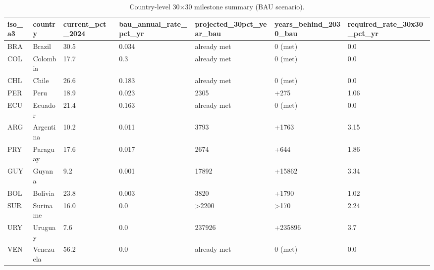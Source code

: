 \begin{table}[htbp]
\centering
\small
\begin{tabular}{lllllll}
\hline
iso\_a3 & country & current\_pct\_2024 & bau\_annual\_rate\_pct\_yr & projected\_30pct\_year\_bau & years\_behind\_2030\_bau & required\_rate\_30x30\_pct\_yr \\
\hline
BRA & Brazil & 30.5 & 0.034 & already met & 0 (met) & 0.0 \\
COL & Colombia & 17.7 & 0.3 & already met & 0 (met) & 0.0 \\
CHL & Chile & 26.6 & 0.183 & already met & 0 (met) & 0.0 \\
PER & Peru & 18.9 & 0.023 & 2305 & +275 & 1.06 \\
ECU & Ecuador & 21.4 & 0.163 & already met & 0 (met) & 0.0 \\
ARG & Argentina & 10.2 & 0.011 & 3793 & +1763 & 3.15 \\
PRY & Paraguay & 17.6 & 0.017 & 2674 & +644 & 1.86 \\
GUY & Guyana & 9.2 & 0.001 & 17892 & +15862 & 3.34 \\
BOL & Bolivia & 23.8 & 0.003 & 3820 & +1790 & 1.02 \\
SUR & Suriname & 16.0 & 0.0 & >2200 & >170 & 2.24 \\
URY & Uruguay & 7.6 & 0.0 & 237926 & +235896 & 3.7 \\
VEN & Venezuela & 56.2 & 0.0 & already met & 0 (met) & 0.0 \\
\hline
\end{tabular}
\caption{Country-level 30×30 milestone summary (BAU scenario).}
\label{tab:pathway_country}
\end{table}